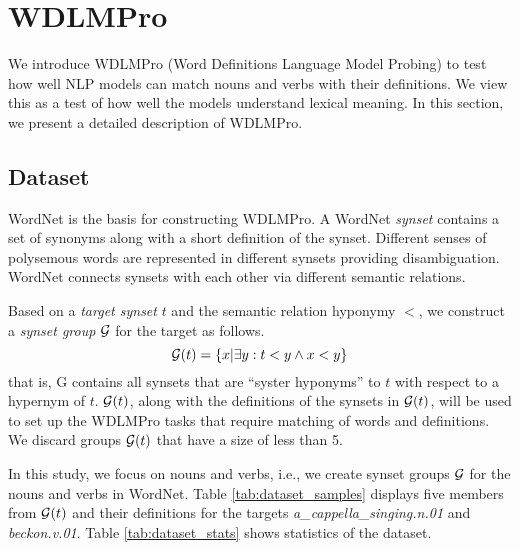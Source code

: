 \documentclass[11pt,a4paper]{article}
\begin{document}
\section{WDLMPro}
We introduce  WDLMPro (Word Definitions Language Model
Probing) to test how well NLP models can match
nouns and verbs with  their
definitions.
We view this as a test of how well the models understand lexical meaning.
In this section, we
present a detailed description of WDLMPro.

\subsection{Dataset}
WordNet \cite{miller95wordnet} is the basis for
constructing WDLMPro.  A WordNet \textit{synset} contains a
set of synonyms along with a short definition of
the synset.  Different senses of polysemous words are
represented in different synsets providing
disambiguation. WordNet connects synsets with each other via
different semantic relations.

Based on a \emph{target synset}
$t$ and the semantic relation hyponymy $<$, we construct
a \emph{synset group} $\cal G$ for the target as follows.
\[
  {\cal G}(t) = \{ x | \exists y: t<y \wedge x<y \}
  \]
that is, {\cal G} contains all synsets that are ``syster
hyponyms'' to $t$ with respect to a hypernym of $t$.
${\cal G}(t)$, along with the definitions of the synsets in
${\cal G}(t)$,
will be used to
set up the WDLMPro tasks that require matching of words and definitions.
We discard groups ${\cal G}(t)$ that
have a size of less than 5.


In this study, we focus on nouns and verbs, i.e., we create
synset groups ${\cal G}$ for the nouns and verbs in WordNet.
Table
\ref{tab:dataset_samples} displays five members from ${\cal
  G} (t)$ 
and their definitions
for the targets
\emph{a\_cappella\_singing.n.01} and
\emph{beckon.v.01}. 
Table \ref{tab:dataset_stats} shows statistics of the dataset.




  
\end{document}
